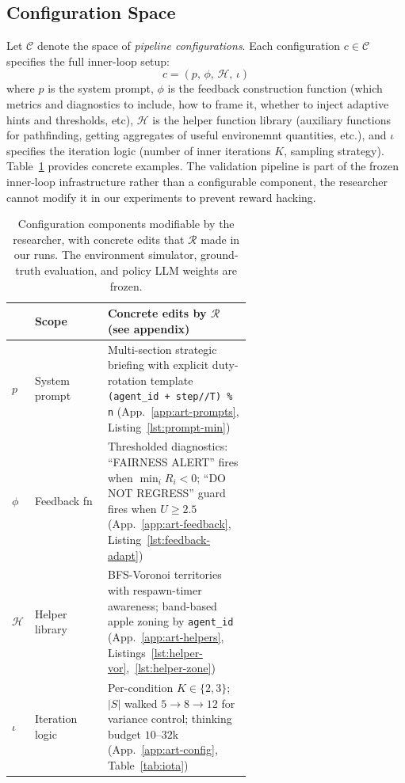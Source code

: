 \documentclass{article}
\newcommand{\cR}{\mathcal{R}}
\newcommand{\cC}{\mathcal{C}}
\begin{document}
\subsection{Configuration Space}

Let $\cC$ denote the space of \emph{pipeline configurations}. Each configuration $c \in \cC$ specifies the full inner-loop setup:
\begin{equation}
  c = (p,\, \phi,\, \mathcal{H},\, \iota)
\end{equation}
where $p$ is the system prompt, $\phi$ is the feedback construction function (which metrics and diagnostics to include, how to frame it, whether to inject adaptive hints and thresholds, etc), $\mathcal{H}$ is the helper function library (auxiliary functions for pathfinding, getting aggregates of useful environemnt quantities, etc.), and $\iota$ specifies the iteration logic (number of inner iterations $K$, sampling strategy). Table~\ref{tab:config} provides concrete examples. The validation pipeline is part of the frozen inner-loop infrastructure rather than a configurable component, the researcher cannot modify it in our experiments to prevent reward hacking.

\begin{table}[t]
\caption{Configuration components modifiable by the researcher, with concrete edits that $\cR$ made in our runs. The environment simulator, ground-truth evaluation, and policy LLM weights are frozen.}
\label{tab:config}
\centering
\footnotesize
\begin{tabular}{@{}llp{0.60\linewidth}@{}}
\toprule
 & Scope & Concrete edits by $\cR$ (see appendix) \\
\midrule
$p$ & System prompt & Multi-section strategic briefing with explicit duty-rotation template \texttt{(agent\_id + step//T) \% n} (App.~\ref{app:art-prompts}, Listing~\ref{lst:prompt-min}) \\
$\phi$ & Feedback fn & Thresholded diagnostics: ``FAIRNESS ALERT'' fires when $\min_i R_i {<} 0$; ``DO NOT REGRESS'' guard fires when $U {\geq} 2.5$ (App.~\ref{app:art-feedback}, Listing~\ref{lst:feedback-adapt}) \\
$\mathcal{H}$ & Helper library & BFS-Voronoi territories with respawn-timer awareness; band-based apple zoning by \texttt{agent\_id} (App.~\ref{app:art-helpers}, Listings~\ref{lst:helper-vor},~\ref{lst:helper-zone}) \\
$\iota$ & Iteration logic & Per-condition $K{\in}\{2,3\}$; $|S|$ walked $5{\to}8{\to}12$ for variance control; thinking budget $10$--$32$k (App.~\ref{app:art-config}, Table~\ref{tab:iota}) \\
\bottomrule
\end{tabular}
\end{table}
\end{document}
